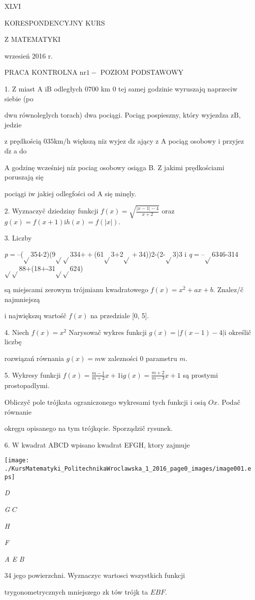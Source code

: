 \documentclass[a4paper,12pt]{article}
\begin{document}
XLVI

KORESPONDENCYJNY KURS

Z MATEMATYKI

wrzesień 2016 r.

PRACA KONTROLNA $\mathrm{n}\mathrm{r} 1-$ POZIOM PODSTAWOWY

1. $\mathrm{Z}$ miast A $\mathrm{i}\mathrm{B}$ odległych $0700$ km $0$ tej samej godzinie wyruszajq naprzeciw siebie (po

dwu równoleglych torach) dwa pociągi. Pociąg pospieszny, który wyjezdza $\mathrm{z}\mathrm{B}$, jedzie

$\mathrm{z}$ prędkością $035\mathrm{k}\mathrm{m}/\mathrm{h}$ większą $\mathrm{n}\mathrm{i}\dot{\mathrm{z}}$ wyjez $\mathrm{d}\dot{\mathrm{z}}$ ający $\mathrm{z}$ A pociąg osobowy $\mathrm{i}$ przyjez $\mathrm{d}\dot{\mathrm{z}}$ a do

A godzinę wcześniej $\mathrm{n}\mathrm{i}\dot{\mathrm{z}}$ pociag osobowy osiąga B. $\mathrm{Z}$ jakimi prędkościami poruszają się

pociągi $\mathrm{i}\mathrm{w}$ jakiej odlegfości od A się minęly.

2. Wyznaczyč dziedziny funkcji $f(x)=\sqrt{\frac{|x-1|-4}{x+2}}$ oraz $g(x)=f(x+1) \mathrm{i}h(x)=f(|x|).$

3. Liczby

{\it p}$=$--($\sqrt{}$354-2)(9$\sqrt{}\sqrt{}$334$++$(61$\sqrt{}$3$+$2$\sqrt{}+$34))2-(2-$\sqrt{}$3)3 i {\it q}$=$--$\sqrt{}$6346-314$\sqrt{}\sqrt{}$88$+$(18$+$-31$\sqrt{}\sqrt{}$624)

są miejscami zerowym trójmianu kwadratowego $f(x)=x^{2}+ax+b$. Znalez/č najmniejszą

$\mathrm{i}$ największq wartośč $f(x)$ na przedziale $[0$, 5$].$

4. Niech $f(x) = x^{2}$ Narysowač wykres funkcji $g(x) = |f(x-1) -4| \mathrm{i}$ określič liczbę

rozwiązań równania $g(x)=m\mathrm{w}$ zalezności $0$ parametru $m.$

5. Wykresy funkcji $f(x) = \displaystyle \frac{m-1}{m+2}x+1\mathrm{i}g(x) =\displaystyle \frac{m+2}{m-3}x+1$ są prostymi prostopadlymi.

Obliczyč pole trójkata ograniczonego wykresami tych funkcji $\mathrm{i}$ osią $Ox$. Podač równanie

okręgu opisanego na tym trójkqcie. Sporządzič rysunek.

6. $\mathrm{W}$ kwadrat ABCD wpisano kwadrat EFGH, ktory zajmuje
\begin{center}
\texttt{[image: ./KursMatematyki\_PolitechnikaWroclawska\_1\_2016\_page0\_images/image001.eps]}
\end{center}
{\it D}

{\it G} $C$

{\it H}

{\it F}

{\it A E  B}

34 jego powierzchni. Wyznaczyc wartosci wszystkich funkcji

trygonometrycznych mniejszego $\mathrm{z}\mathrm{k}$ tów trójk ta $EBF.$
\end{document}
